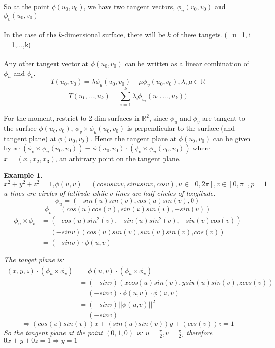 \documentclass[12pt]{article}
\theoremstyle{plain}
\newtheorem{example}[theorem]{Example}
\theoremstyle{definition}
\begin{document}
So at the point $\phi (u_0, v_0)$, we have two tangent vectors, $\phi_u (u_0, v_0)$ and $\phi_v (u_0, v_0)$\\
\\
In the case of the $k$-dimensional surface, there will be $k$ of these tangets. (\phi_{u_1}, i = 1,...,k)\\
\\
Any other tangent vector at $\phi (u_0, v_0)$ can be written as a linear combination of $\phi_u$ and $\phi_v$.
$$T(u_0, v_0) = \lambda \phi_u (u_0, v_0) + \mu \phi_v (u_0, v_0), \lambda, \mu \in \mathbb{R}$$
$$T(u_1, ..., u_k) = \sum^k_{i=1} \lambda_i \phi_{u_i} (u_1, ..., u_k))$$

For the moment, restrict to 2-dim surfaces in $\mathbb{R}^2$, since $\phi_u$ and $\phi_v$ are tangent to the surface $\phi (u_0, v_0)$, $\phi_v \times \phi_u (u_0, v_0)$ is perpendicular to the surface (and tangent plane) at $\phi (u_0, v_0)$. Hence the tangent plane at $\phi (u_0, v_0)$ can be given by $x\cdot (\phi_v \times \phi_u (u_0, v_0)) = \phi (u_0, v_0) \cdot (\phi_v \times \phi_u (u_0, v_0))$ where $x=(x_1, x_2, x_3)$, an arbitrary point on the tangent plane.

\begin{example}
	$x^2 + y^2 + z^2 = 1, \phi (u,v) = (cosu sinv, sinu sinv, cosv), u\in [0,2\pi], v\in [0,\pi], p=1$\\
	$u$-lines are circles of latitude while $v$-lines are half circles of longitude.\\
	$$\phi_u = (-sin(u)sin(v), cos(u)sin(v), 0)$$
	$$\phi_v = (cos(u)cos(u), sin(u)sin(v), -sin(v))$$
	\begin{align*}
		\phi_u \times \phi_v &= (-cos(u)sin^2(v), -sin(u)sin^2 (v), -sin(v)cos(v))\\
		&= (-sinv)(cos(u)sin(v), sin(u)sin(v), cos(v))\\
		&= (-sinv)\cdot \phi (u,v)
	\end{align*}

	The tanget plane is:
	\begin{align*}
		(x,y,z)\cdot (\phi_u \times \phi_v) &= \phi (u,v) \cdot (\phi_u \times \phi_v)\\
		&= (-sinv)(xcos(u)sin(v), ysin(u)sin(v), zcos(v))\\
		&= (-sinv) \cdot  \phi (u,v) \cdot  \phi (u,v)\\
		&= (-sinv) || \phi (u,v) ||^2\\
		&= (-sinv)
	\end{align*}
	$$\Longrightarrow (cos(u)sin(v))x + (sin(u)sin(v))y + (cos(v))z = 1$$
	So the tangent plane at the point $(0,1,0)$ is:
	$u=\frac{\pi}{2}, v=\frac{\pi}{2}$, therefore $0x + y + 0z = 1 \Longrightarrow y=1$

\end{example}
\end{document}
